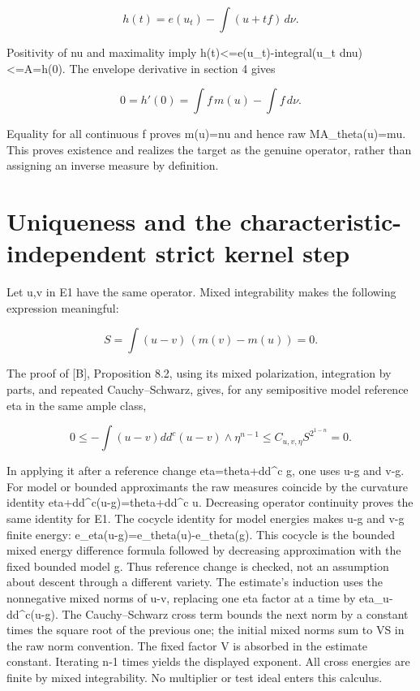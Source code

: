 \documentclass[11pt]{article}
\begin{document}
\[
h(t)=e(u_t)-\int(u+tf)\,d\nu.
\]

Positivity of nu and maximality imply h(t)\textless{}=e(u\_t)-integral(u\_t dnu)\textless{}=A=h(0). The envelope derivative in section 4 gives

\[
0=h'(0)=\int f\,m(u)-\int f\,d\nu.
\]

Equality for all continuous f proves m(u)=nu and hence raw MA\_theta(u)=mu. This proves existence and realizes the target as the genuine operator, rather than assigning an inverse measure by definition.

\section{Uniqueness and the characteristic-independent strict kernel step}

Let u,v in E1 have the same operator. Mixed integrability makes the following expression meaningful:

\[
S=\int(u-v)\,(m(v)-m(u))=0.
\]

The proof of [B], Proposition 8.2, using its mixed polarization, integration by parts, and repeated Cauchy--Schwarz, gives, for any semipositive model reference eta in the same ample class,

\[
0\leq-\int (u-v)dd^c(u-v)\wedge\eta^{n-1}
\leq C_{u,v,\eta}S^{2^{1-n}}=0.
\]

In applying it after a reference change eta=theta+dd\textasciicircum{}c g, one uses u-g and v-g. For model or bounded approximants the raw measures coincide by the curvature identity eta+dd\textasciicircum{}c(u-g)=theta+dd\textasciicircum{}c u. Decreasing operator continuity proves the same identity for E1. The cocycle identity for model energies makes u-g and v-g finite energy: e\_eta(u-g)=e\_theta(u)-e\_theta(g). This cocycle is the bounded mixed energy difference formula followed by decreasing approximation with the fixed bounded model g. Thus reference change is checked, not an assumption about descent through a different variety. The estimate's induction uses the nonnegative mixed norms of u-v, replacing one eta factor at a time by eta\_u-dd\textasciicircum{}c(u-g). The Cauchy--Schwarz cross term bounds the next norm by a constant times the square root of the previous one; the initial mixed norms sum to VS in the raw norm convention. The fixed factor V is absorbed in the estimate constant. Iterating n-1 times yields the displayed exponent. All cross energies are finite by mixed integrability. No multiplier or test ideal enters this calculus.
\end{document}

